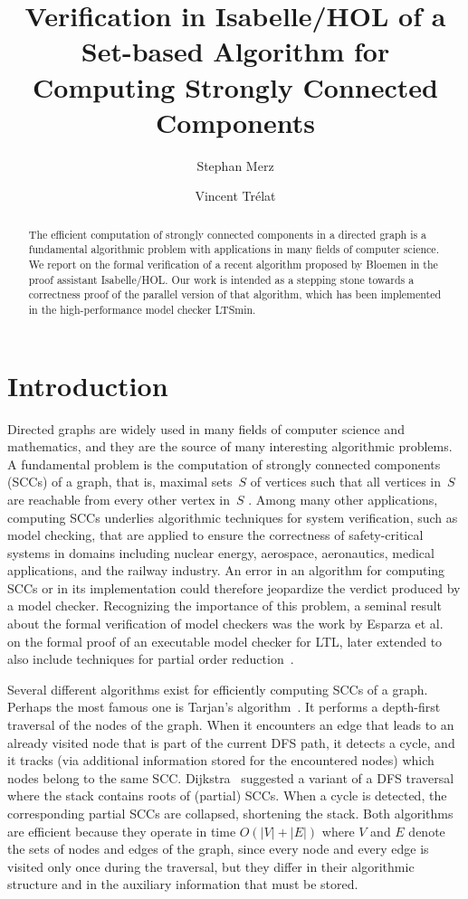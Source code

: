 \documentclass[sigplan,10pt,anonymous,review]{acmart}
\title{Verification in Isabelle/HOL of a Set-based Algorithm for Computing Strongly Connected Components}
\author{Stephan Merz}
\affiliation{
  \institution{University of Lorraine, CNRS, Inria, LORIA}
  \city{Nancy}
  \country{France}
}
\author{Vincent Trélat}
\affiliation{
  \institution{University of Lorraine}
  \city{Nancy}
  \country{France}
}
\begin{document}
\begin{abstract}
  The efficient computation of strongly connected components in a directed graph is a fundamental algorithmic problem with applications in many fields of computer science. We report on the formal verification of a recent algorithm proposed by Bloemen in the proof assistant Isabelle/HOL. Our work is intended as a stepping stone towards a correctness proof of the parallel version of that algorithm, which has been implemented in the high-performance model checker LTSmin.
\end{abstract}

\maketitle

\section{Introduction}
\label{sec:introduction}

Directed graphs are widely used in many fields of computer science and mathematics, and they are the source of many interesting algorithmic problems. A fundamental problem is the computation of strongly connected components (SCCs) of a graph, that is, maximal sets~$S$ of vertices such that all vertices in~$S$ are reachable from every other vertex in~$S$ \cite[Chap.~4.2]{sedgewick:algorithms}. Among many other applications, computing SCCs underlies algorithmic techniques for system verification, such as model checking, that are applied to ensure the correctness of safety-critical systems in domains including nuclear energy, aerospace, aeronautics, medical applications, and the railway industry. An error in an algorithm for computing SCCs or in its implementation could therefore jeopardize the verdict produced by a model checker. Recognizing the importance of this problem, a seminal result about the formal verification of model checkers was the work by Esparza et al.~\cite{esparza:cava} on the formal proof of an executable model checker for LTL, later extended to also include techniques for partial order reduction~\cite{brunner:partial-order}.

Several different algorithms exist for efficiently computing SCCs of a graph. Perhaps the most famous one is Tarjan's algorithm~\cite{tarjan:depth-first}. It performs a depth-first traversal of the nodes of the graph. When it encounters an edge that leads to an already visited node that is part of the current DFS path, it detects a cycle, and it tracks (via additional information stored for the encountered nodes) which nodes belong to the same SCC. Dijkstra~\cite{dijkstra:finding} suggested a variant of a DFS traversal where the stack contains roots of (partial) SCCs. When a cycle is detected, the corresponding partial SCCs are collapsed, shortening the stack. Both algorithms are efficient because they operate in time $O(|V|+|E|)$ where $V$ and $E$ denote the sets of nodes and edges of the graph, since every node and every edge is visited only once during the traversal, but they differ in their algorithmic structure and in the auxiliary information that must be stored.
\end{document}
